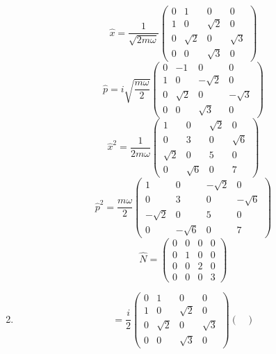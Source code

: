 \begin{sol}
\begin{enumerate}[label=\textbf{(\alph*)}]
\begin{equation}
	\hat x=\frac{1}{\sqrt{2m\omega}}\begin{pmatrix}
0&1&0&0\\1&0&\sqrt{2}&0\\0&\sqrt{2}&0&\sqrt{3}\\0&0&\sqrt{3}&0
\end{pmatrix}
\end{equation} 
\begin{equation}
	\hat p=i\sqrt{\frac{m\omega}{2}}\begin{pmatrix}
0&-1&0&0\\1&0&-\sqrt{2}&0\\0&\sqrt{2}&0&-\sqrt{3}\\0&0&\sqrt{3}&0
\end{pmatrix}
\end{equation}
\begin{equation}
	\hat x^2=\frac{1}{2m\omega}\begin{pmatrix}
1&0&\sqrt{2}&0\\0&3&0&\sqrt{6}\\\sqrt{2}&0&5&0\\0&\sqrt{6}&0&7
\end{pmatrix}
\end{equation}
\begin{equation}
	\hat p^2=\frac{m\omega}{2}\begin{pmatrix}
1&0&-\sqrt{2}&0\\0&3&0&-\sqrt{6}\\-\sqrt{2}&0&5&0\\0&-\sqrt{6}&0&7
\end{pmatrix}
\end{equation}
\begin{equation}
	\hat N=\begin{pmatrix}
0&0&0&0\\0&1&0&0\\0&0&2&0\\0&0&0&3
\end{pmatrix}
\end{equation}
\item
\begin{equation}
	[\hat x,\hat p]=\frac{i}{2}\begin{pmatrix}
0&1&0&0\\1&0&\sqrt{2}&0\\0&\sqrt{2}&0&\sqrt{3}\\0&0&\sqrt{3}&0
\end{pmatrix}\begin{pmatrix}

\end{pmatrix}
\end{equation}
\end{enumerate}
\end{sol}

